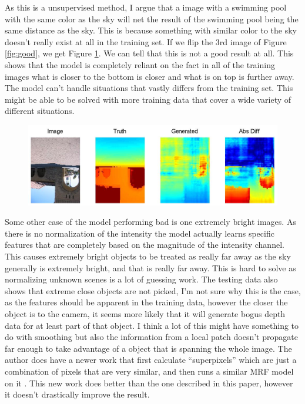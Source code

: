 \documentclass[journal]{IEEEtran}
\begin{document}
As this is a unsupervised method, I argue that a image with a swimming pool with the same color as the sky will net the result of the swimming pool being the same distance as the sky. This is because something with similar color to the sky doesn't really exist at all in the training set. If we flip the 3rd image of Figure \ref{fig:good}, we get Figure \ref{fig:flip}. We can tell that this is not a good result at all. This shows that the model is completely reliant on the fact in all of the training images what is closer to the bottom is closer and what is on top is further away. The model can't handle situations that vastly differs from the training set. This might be able to be solved with more training data that cover a wide variety of different situations.

\begin{figure}
\label{fig:flip}
\centering
\includegraphics[width=\linewidth]{flip.png}
\caption{}
\end{figure}

Some other case of the model performing bad is one extremely bright images. As there is no normalization of the intensity the model actually learns specific features that are completely based on the magnitude of the intensity channel. This causes extremely bright objects to be treated as really far away as the sky generally is extremely bright, and that is really far away. This is hard to solve as normalizing unknown scenes is a lot of guessing work. The testing data also shows that extreme close objects are not picked, I'm not sure why this is the case, as the features should be apparent in the training data, however the closer the object is to the camera, it seems more likely that it will generate bogus depth data for at least part of that object. I think a lot of this might have something to do with smoothing but also the information from a local patch doesn't propagate far enough to take advantage of a object that is spanning the whole image. The author does have a newer work that first calculate ``superpixels'' which are just a combination of pixels that are very similar, and then runs a similar MRF model on it \cite{saxenaSU}. This new work does better than the one described in this paper, however it doesn't drastically improve the result.
\end{document}
